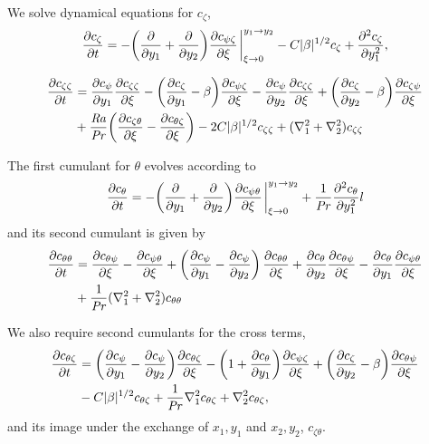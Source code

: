 \documentclass{jfm}
\newcommand{\cz}{c_{\zeta}}
\newcommand{\cs}{c_{\psi}}
\newcommand{\ct}{c_{\theta}}
\newcommand{\csz}{c_{\psi \zeta}}
\newcommand{\czs}{c_{\zeta \psi}}
\newcommand{\czz}{c_{\zeta \zeta}}
\newcommand{\ctz}{c_{\theta \zeta}}
\newcommand{\czt}{c_{\zeta \theta}}
\newcommand{\ctt}{c_{\theta \theta}}
\newcommand{\cst}{c_{\psi \theta}}
\newcommand{\cts}{c_{\theta \psi}}
\newcommand{\Rayleigh}{\mbox{\textit{Ra}}}  %
\begin{document}
We solve dynamical equations for $\cz$,
\begin{equation}
  \label{eq:cz}
  \pdv{\cz}{t} = - \qty(\pdv{y_1} + \pdv{y_2}) \pdv{\csz}{\xi}\eval_{\xi \to 0}^{y_1 \to y_2} - C |\beta|^{1/2} \cz + \pdv[2]{\cz}{y_1},
\end{equation}

\begin{equation}
  \label{eq:czz}
  \begin{split}
    \pdv{\czz}{t} &= \pdv{\cs}{y_1} \pdv{\czz}{\xi} - \qty(\pdv{\cz}{y_1} - \beta) \pdv{\csz}{\xi} - \pdv{\cs}{y_2} \pdv{\czz}{\xi}  + \qty(\pdv{\cz}{y_2} - \beta) \pdv{\czs}{\xi}\\
    &+ \frac{\Rayleigh}{\Pran} \qty(\pdv{\czt}{\xi} -  \pdv{\ctz}{\xi}) - 2C |\beta|^{1/2} \czz + (\nabla_1^2 + \nabla_2^2) \czz    
  \end{split}
\end{equation}

The first cumulant for $\theta$ evolves according to
\begin{equation}
  \label{eq:ct}
  \pdv{\ct}{t} = - \qty(\pdv{y_1} + \pdv{y_2}) \pdv{\cst}{\xi} \eval_{\xi \to 0}^{y_1 \to y_2} + \frac{1}{\Pran} \pdv[2]{\ct}{y_1}l
\end{equation}
and its second cumulant is given by
\begin{equation}
  \label{eq:ctt}
\begin{split}
  \pdv{\ctt}{t} &= \pdv{\cts}{\xi} - \pdv{\cst}{\xi} + \left(\pdv{\cs}{y_1} - \pdv{\cs}{y_2}\right)\pdv{\ctt}{\xi} + \pdv{\ct}{y_2}\pdv{\cts}{\xi} - \pdv{\ct}{y_1}\pdv{\cst}{\xi}\\
&  + \frac{1}{\Pran}(\nabla_1^2 + \nabla_2^2) \ctt
\end{split}
\end{equation}

We also require second cumulants for the cross terms,
\begin{equation}
  \label{eq:ctz}
  \begin{split}
    \pdv{\ctz}{t} &= \qty(\pdv{\cs}{y_1} - \pdv{\cs}{y_2}) \pdv{\ctz}{\xi} - \qty(1 + \pdv{\ct}{y_1}) \pdv{\csz}{\xi} + \qty(\pdv{\cz}{y_2} - \beta) \pdv{\cts}{\xi}\\
    &  - C |\beta|^{1/2} \ctz + \frac{1}{\Pran} \nabla_1^2 \ctz + \nabla_2^2 \ctz,
  \end{split}
\end{equation}
and its image under the exchange of $x_1,y_1$ and $x_2, y_2$, $\czt$.
\end{document}
